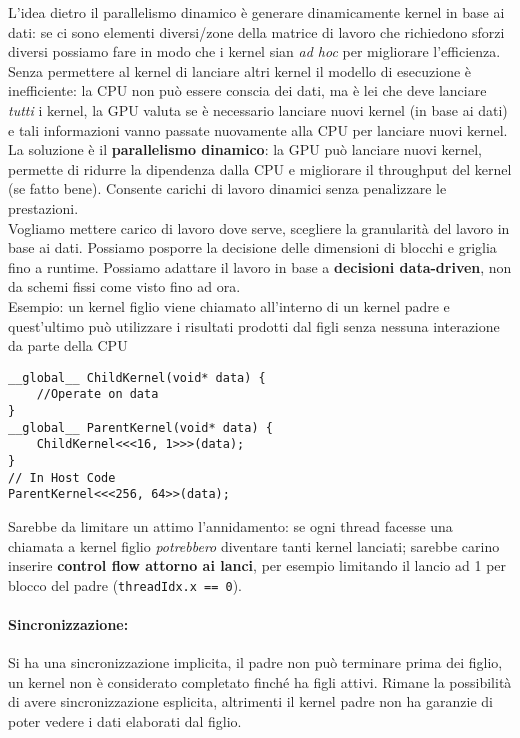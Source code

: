 L'idea dietro il parallelismo dinamico è generare dinamicamente kernel in base ai dati: se ci sono elementi diversi/zone della matrice di lavoro che richiedono sforzi diversi possiamo fare in modo che i kernel sian \textit{ad hoc} per migliorare l'efficienza.\\


Senza permettere al kernel di lanciare altri kernel il modello di esecuzione è inefficiente: la CPU non può essere conscia dei dati, ma è lei che deve lanciare \textit{tutti} i kernel, la GPU valuta se è necessario lanciare nuovi kernel (in base ai dati) e tali informazioni vanno passate nuovamente alla CPU per lanciare nuovi kernel.\\

La soluzione è il \textbf{parallelismo dinamico}: la GPU può lanciare nuovi kernel, permette di ridurre la dipendenza dalla CPU e migliorare il throughput del kernel (se fatto bene). Consente carichi di lavoro dinamici senza penalizzare le prestazioni.\\

Vogliamo mettere carico di lavoro dove serve, scegliere la granularità del lavoro in base ai dati. Possiamo posporre la decisione delle dimensioni di blocchi e griglia fino a runtime. Possiamo adattare il lavoro in base a \textbf{decisioni data-driven}, non da schemi fissi come visto fino ad ora.\\

Esempio: un kernel figlio viene chiamato all'interno di un kernel padre e quest'ultimo può utilizzare i risultati prodotti dal figli senza nessuna interazione da parte della CPU
\begin{verbatim}
__global__ ChildKernel(void* data) {
	//Operate on data
}
__global__ ParentKernel(void* data) {
	ChildKernel<<<16, 1>>>(data);
}
// In Host Code
ParentKernel<<<256, 64>>(data);
\end{verbatim}

Sarebbe da limitare un attimo l'annidamento: se ogni thread facesse una chiamata a kernel figlio \textit{potrebbero} diventare tanti kernel lanciati; sarebbe carino inserire \textbf{control flow attorno ai lanci}, per esempio limitando il lancio ad 1 per blocco del padre (\texttt{threadIdx.x == 0}).\\

\paragraph{Sincronizzazione:} Si ha una sincronizzazione implicita, il padre non può terminare prima dei figlio, un kernel non è considerato completato finché ha figli attivi. Rimane la possibilità di avere sincronizzazione esplicita, altrimenti il kernel padre non ha garanzie di poter vedere i dati elaborati dal figlio. \\


